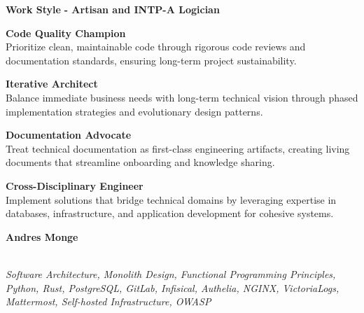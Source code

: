\documentclass[a4paper,10pt]{article}
\newcommand{\experiencebreak}{\needspace{18\baselineskip}}
\begin{document}
\vspace{0.5cm}
\noindent
\begin{minipage}{\textwidth}
	{\large\bfseries\color{darkblue}\selectfont Work Style}
	{\small\bfseries\color{darkblue}\selectfont - Artisan and INTP-A Logician}
	\vspace{0.4cm}

	\begin{minipage}{0.48\textwidth}
		\noindent\textbf{Code Quality Champion} \\
		Prioritize clean, maintainable code through rigorous code reviews and documentation standards, ensuring long-term project sustainability.

		\vspace{0.3cm}
		\noindent\textbf{Iterative Architect} \\
		Balance immediate business needs with long-term technical vision through phased implementation strategies and evolutionary design patterns.
	\end{minipage}
	\hfill
	\begin{minipage}{0.48\textwidth}
		\noindent\textbf{Documentation Advocate} \\
		Treat technical documentation as first-class engineering artifacts, creating living documents that streamline onboarding and knowledge sharing.

		\vspace{0.3cm}
		\noindent\textbf{Cross-Disciplinary Engineer} \\
		Implement solutions that bridge technical domains by leveraging expertise in databases, infrastructure, and application development for cohesive systems.
	\end{minipage}
\end{minipage}

\newpage
\pagecolor{seoncdarybackground}

\vspace{0.5cm}
\noindent
\vspace{0.2cm}

\hfill
{\large\bfseries\color{blue}\selectfont
	A\color{lightblue}ndr\color{blue}e\color{lightblue}s \color{blue}Monge}
\vspace{0.3cm}

\experiencebreak
\noindent\uline{} \\
\vspace{0.1cm} \hspace{0.2cm}
{\small\textit{Software Architecture, Monolith Design, Functional Programming Principles, Python, Rust, PostgreSQL, GitLab, Infisical, Authelia, NGINX, VictoriaLogs, Mattermost, Self-hosted Infrastructure, OWASP}}
\end{document}
